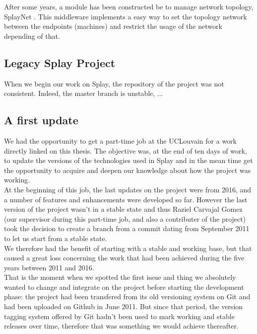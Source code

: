 \documentclass{eplmastersthesis}
\begin{document}
      After some years, a module has been constructed be to manage network
      topology, SplayNet \cite{SplayNet}. This middleware implements a easy
      way to set the topology network between the endpoints (machines) and
      restrict the usage of the network depending of that.

      \subsection{Legacy Splay Project}

        When we begin our work on Splay, the repository of the
        project \cite{SplayGit} was not consistent. Indeed,
        the master branch is unstable, ...

      \subsection{A first update}

        We had the opportunity to get a part-time job at the UCLouvain for
        a work directly linked on this thesis. The objective was, at the end
        of ten days of work, to update the versions of the technologies used
        in Splay and in the mean time get the opportunity to acquire and
        deepen our knowledge about how the project was working.\\

        At the beginning of this job, the last updates on the project were
        from 2016, and a number of features and enhancements were developed
        so far. However the last version of the project wasn't in a stable
        state and thus Raziel Carvajal Gomez (our supervisor during this
        part-time job, and also a contributer of the project) took the decision
        to create a branch from a commit dating from September 2011 to let us
        start from a stable state.\\
        We therefore had the benefit of starting with a stable and working
        base, but that caused a great loss concerning the work that had been
        achieved during the five years between 2011 and 2016.\\
        That is the moment when we spotted the first issue and thing we
        absolutely wanted to change and integrate on the project before
        starting the development phase: the project had been transfered from
        its old versioning system on Git and had been uploaded on Github in
        June 2011. But since that period, the version tagging system offered
        by Git hadn't been used to mark working and stable releases over time,
        therefore that was something we would achieve thereafter.\\
\end{document}
